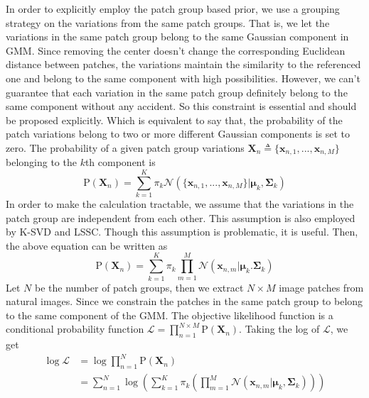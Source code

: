 \documentclass[10pt,twocolumn,letterpaper]{article}
\begin{document}
In order to explicitly employ the patch group based prior, we use a grouping strategy on the variations from the same patch groups. That is, we let the variations in the same patch group belong to the same Gaussian component in GMM. Since removing the center doesn't change the corresponding Euclidean distance between patches, the variations maintain the similarity to the referenced one and belong to the same component with high possibilities. However, we can't guarantee that each variation in the same patch group definitely belong to the same component without any accident. So this constraint is essential and should be proposed explicitly. Which is equivalent to say that, the probability of the patch variations belong to two or more different Gaussian components is set to zero. The probability of a given patch group variations ${\mathbf{X}_{n}} \triangleq \{\mathbf{x}_{n,1},...,\mathbf{x}_{n,M}\}$ belonging to the $k$th component is
\begin{equation}
\mathrm{P}(\mathbf{X}_{n}) =  \sum_{k=1}^{K}\pi_{k}\mathcal{N}(\{\mathbf{x}_{n,1},...,\mathbf{x}_{n,M}\}|\mathbf{\mu}_{k},\mathbf{\Sigma}_{k})
\end{equation}
In order to make the calculation tractable, we assume that the variations in the patch group are independent from each other. This assumption is also employed by K-SVD\cite{ksvd} and LSSC\cite{lssc}. Though this assumption is problematic, it is useful. Then, the above equation can be written as
\begin{equation}
\mathrm{P}(\mathbf{X}_{n})  = \sum_{k=1}^{K}\pi_{k}\prod_{m=1}^{M}\mathcal{N}(\mathbf{x}_{n,m}|\mathbf{\mu}_{k}.\mathbf{\Sigma}_{k})
\end{equation}
Let $N$ be the number of patch groups, then we extract $N\times M$ image patches from natural images. Since we constrain the patches in the same patch group to belong to the same component of the GMM. The objective likelihood function is a conditional probability function $\mathcal{L} = \prod_{n=1}^{N\times M}\mathrm{P}(\mathbf{X}_{n})$. Taking the log of $\mathcal{L}$, we get
\begin{equation}\label{equ6}
\begin{split}
\log\mathcal{L} &= \log\prod_{n=1}^{N} \mathrm{P}(\mathbf{X}_{n})
\\
& = \sum_{n=1}^{N} \log(\sum_{k=1}^{K}\pi_{k}(\prod_{m=1}^{M}\mathcal{N}(\mathbf{x}_{n,m}|\mathbf{\mu}_{k},\mathbf{\Sigma}_{k})))
\end{split}
\end{equation}
\end{document}
